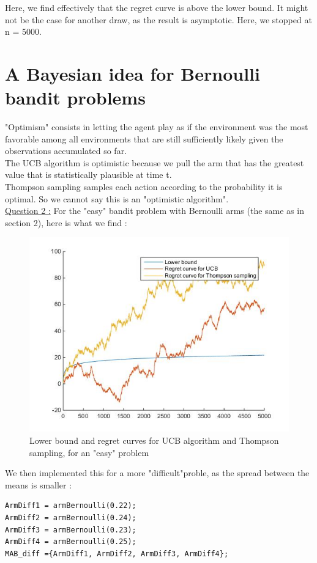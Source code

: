 \documentclass[11pt,a4paper]{article}
\begin{document}
Here, we find effectively that the regret curve is above the lower bound. It might not be the case for another draw, as the result is asymptotic. Here, we stopped at n = 5000.

\section{A Bayesian idea for Bernoulli bandit problems}

"Optimism" consists in letting the agent play as if the environment was the most favorable among all environments that are still sufficiently likely given the observations accumulated so far.
\\
The UCB algorithm is optimistic because we pull the arm that has the greatest value that is statistically plausible at time t.
\\
Thompson sampling samples each action according to the probability it is optimal. So we cannot say this is an "optimistic algorithm".
\\[5mm]
\underline{Question 2 :} For the "easy" bandit problem with Bernoulli arms (the same as in section 2), here is what we find :

\begin{figure}[H]
	\centering
	\noindent\includegraphics[scale=0.4]{regret_thom_easy.jpg}
	\caption{Lower bound and regret curves for UCB algorithm and Thompson sampling, for an "easy" problem}
\end{figure}

We then implemented this for a more "difficult"proble, as the spread between the means is smaller :
\begin{verbatim}
ArmDiff1 = armBernoulli(0.22);
ArmDiff2 = armBernoulli(0.24);
ArmDiff3 = armBernoulli(0.23);
ArmDiff4 = armBernoulli(0.25);
MAB_diff ={ArmDiff1, ArmDiff2, ArmDiff3, ArmDiff4};
\end{verbatim}
\end{document}
